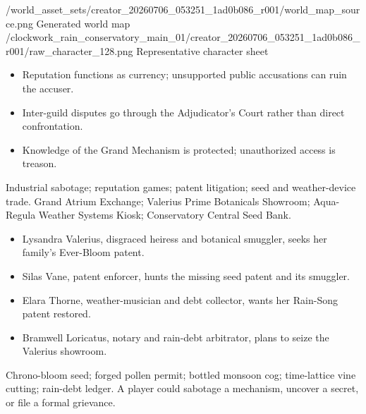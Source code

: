 \documentclass[10pt]{article}
\begin{document}
\clearpage
{}

\vspace{7pt}
\worldvisuals
  {\evidencepath/world_asset_sets/creator_20260706_053251_1ad0b086_r001/world_map_source.png}
  {Generated world map}
  {\evidencepath/clockwork_rain_conservatory_main_01/creator_20260706_053251_1ad0b086_r001/raw_character_128.png}
  {Representative character sheet}

\begin{minipage}[t]{0.48\linewidth}
\begin{itemize}
\item Reputation functions as currency; unsupported public accusations can ruin the accuser.
\item Inter-guild disputes go through the Adjudicator's Court rather than direct confrontation.
\item Knowledge of the Grand Mechanism is protected; unauthorized access is treason.
\end{itemize}
Industrial sabotage; reputation games; patent litigation; seed and weather-device trade.
Grand Atrium Exchange; Valerius Prime Botanicals Showroom; Aqua-Regula Weather Systems Kiosk; Conservatory Central Seed Bank.
\end{minipage}\hfill
\begin{minipage}[t]{0.48\linewidth}
\begin{itemize}
\item Lysandra Valerius, disgraced heiress and botanical smuggler, seeks her family's Ever-Bloom patent.
\item Silas Vane, patent enforcer, hunts the missing seed patent and its smuggler.
\item Elara Thorne, weather-musician and debt collector, wants her Rain-Song patent restored.
\item Bramwell Loricatus, notary and rain-debt arbitrator, plans to seize the Valerius showroom.
\end{itemize}
Chrono-bloom seed; forged pollen permit; bottled monsoon cog; time-lattice vine cutting; rain-debt ledger. A player could sabotage a mechanism, uncover a secret, or file a formal grievance.
\end{minipage}
\end{document}

